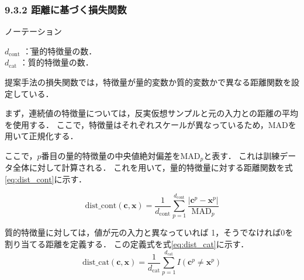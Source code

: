 \documentclass[dvipdfmx]{jreport}
\begin{document}
\subsubsection{9.3.2 距離に基づく損失関数}
\begin{itembox}[l]{\large{ノーテーション}}
    \begin{tabbing}
        \hspace{15pt} \raisebox{0.5ex}{\tiny $\bullet$} $d_{\text{cont}}$ \=：量的特徴量の数．\\[0.5em]
        \hspace{15pt} \raisebox{0.5ex}{\tiny $\bullet$} $d_{\text{cat}}$ \>：質的特徴量の数．
    \end{tabbing}
\end{itembox}

提案手法の損失関数では，特徴量が量的変数か質的変数かで異なる距離関数を設定している．

まず，連続値の特徴量については，反実仮想サンプルと元の入力との距離の平均を使用する．
ここで，特徴量はそれぞれスケールが異なっているため，MADを用いて正規化する．

ここで，$p$番目の量的特徴量の中央値絶対偏差を$\text{MAD}_p$と表す．
これは訓練データ全体に対して計算される．
これを用いて，量的特徴量に対する距離関数を式\eqref{eq:dist_cont}に示す．

\begin{equation}
\text{dist\_cont}(\bm{c}, \bm{x}) = \frac{1}{d_{\text{cont}}} \sum_{p=1}^{d_{\text{cont}}} \frac{|\bm{c}^p - \bm{x}^p|}{\text{MAD}_p} \label{eq:dist_cont}
\end{equation}

質的特徴量に対しては，値が元の入力と異なっていれば 1，そうでなければ0を割り当てる距離を定義する．
この定義式を式\eqref{eq:dist_cat}に示す．
\begin{equation}
\text{dist\_cat}(\bm{c}, \bm{x}) = \frac{1}{d_{\text{cat}}} \sum_{p=1}^{d_{\text{cat}}} \textit{I}(\bm{c}^p \ne \bm{x}^p) \label{eq:dist_cat}
\end{equation}
\end{document}
